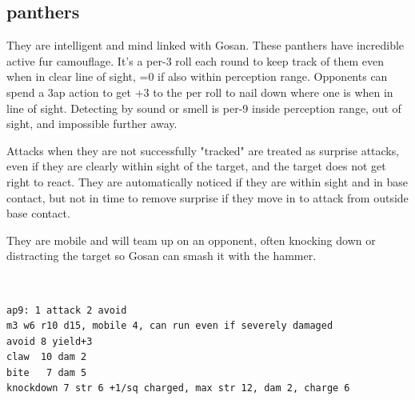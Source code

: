 \begin{samepage}
\subsection*{panthers}
They are intelligent and mind linked with Gosan.
These panthers have incredible active fur camouflage. It's a per-3 roll each round to keep track of them even when in clear line of sight, =0 if also within perception range.
Opponents can spend a 3ap action to get +3 to the per roll to nail down where one is when in line of sight. Detecting by sound or smell is per-9 inside perception range, out of sight, and impossible further away.

Attacks when they are not successfully "tracked" are treated as surprise attacks, even if they are clearly within sight of the target, and the target does not get right to react.
They are automatically noticed if they are within sight and in base contact, but not in time to remove surprise if they move in to attack from outside base contact.

They are mobile and will team up on an opponent, often knocking down or distracting the target so Gosan can smash it with the hammer.

\

\small \begin{verbatim}
ap9: 1 attack 2 avoid
m3 w6 r10 d15, mobile 4, can run even if severely damaged
avoid 8 yield+3
claw  10 dam 2
bite   7 dam 5
knockdown 7 str 6 +1/sq charged, max str 12, dam 2, charge 6
\end{verbatim} \normalsize
\end{samepage}








